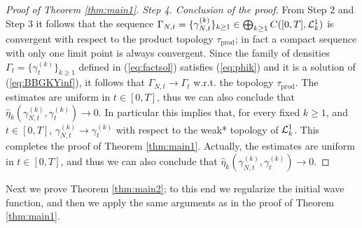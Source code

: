 \documentclass[11pt]{article}
\newcommand{\wh}{\widehat}
\newcommand{\cL}{{\cal L}}
\begin{document}
\begin{proof}[Proof of Theorem \ref{thm:main1}]
\medskip

{\it Step 4. Conclusion of the proof.} {F}rom Step 2 and Step 3 it
follows that the sequence $\Gamma_{N,t} = \{ \gamma^{(k)}_{N,t}
\}_{k \geq 1} \in \bigoplus_{k \geq 1} C([0,T],\cL_k^1)$ is
convergent with respect to the product topology
$\tau_{\text{prod}}$; in fact a compact sequence with only one limit
point is always convergent. Since  the family of densities
$\Gamma_t = \{ \gamma^{(k)}_t \}_{k \geq 1}$ defined in
(\ref{eq:factsol}) satisfies (\ref{eq:phik}) and it
is a solution of (\ref{eq:BBGKYinf}),
 it follows that $\Gamma_{N,t} \to
\Gamma_t$ w.r.t. the topology $\tau_{\text{prod}}$.
The estimates are  uniform in $t\in [0,T]$,
thus we can also conclude that $\wh\eta_k(\gamma^{(k)}_{N,t}, \gamma_t^{(k)})
\to 0$.
In particular
this implies that, for every fixed $k \geq 1$, and $t \in [0,T]$,
$\gamma_{N,t}^{(k)} \to \gamma_t^{(k)}$ with respect to the weak*
topology of $\cL^1_k$. This completes the proof of Theorem
\ref{thm:main1}. Actually, the estimates
are uniform in $t\in [0,T]$, and
thus we can also conclude that $\wh\eta_k(\gamma^{(k)}_{N,t}, \gamma_t^{(k)})
\to 0$.
\end{proof}

\medskip

Next we prove Theorem \ref{thm:main2}; to this end we regularize the
initial wave function, and then we apply the same arguments as in
the proof of Theorem \ref{thm:main1}.
\end{document}
